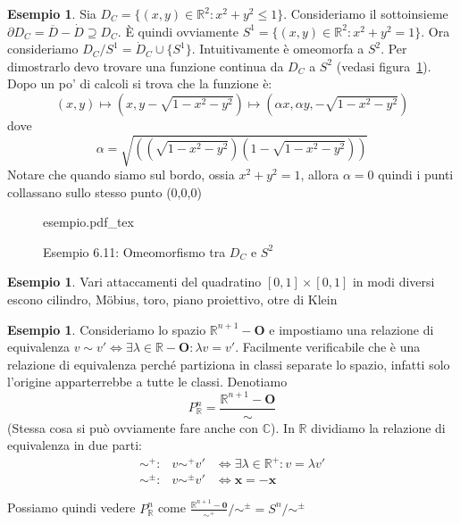 \documentclass{article}
\newcommand{\incfig}[2][1]{%
    \def\svgwidth{#1\columnwidth}
    {#2.pdf_tex}
}
\newcounter{theo}[section]\setcounter{theo}{0}
\newcounter{excounter}[section]\setcounter{excounter}{0}
\theoremstyle{plain}
\theoremstyle{definition}
\newtheorem{example}[excounter]{Esempio}
\theoremstyle{remark}
\begin{document}
\begin{example}
    Sia \(D_C = \{(x,y) \in \mathbb{R}^2:x^2+y^2\le 1\} \). Consideriamo il
    sottoinsieme \(\partial D_C = \overline{D} - \dot{D} \supseteq D_C \). È
    quindi ovviamente \(S^{1} = \{(x,y) \in \mathbb{R}^2 : x^2+y^2 = 1\} \). Ora
    consideriamo \(D_C / S^{1} = \dot{D}_C \cup \{S^{1}\} \). Intuitivamente è
    omeomorfa a \(S^{2}\). Per dimostrarlo devo trovare una funzione continua da
    \(D_C\) a \(S^{2}\) (vedasi figura~\ref{fig:esempio}). Dopo un po' di
    calcoli si trova che la funzione è:
    \[
        (x, y) \mapsto (x, y -\sqrt{1- x^2 - y^2}) \mapsto (\alpha x, \alpha y,
        -\sqrt{1 - x^2 - y^2})
    \]
    dove 
    \[
        \alpha = \sqrt{((\sqrt{1-x^2-y^2})(1-\sqrt{1-x^2-y^2}))}
    \]
    Notare che quando siamo sul bordo, ossia \(x^2+y^2=1\), allora \(\alpha =
    0\) quindi i punti collassano sullo stesso punto (0,0,0)
\end{example}
\begin{figure}[ht]
    \centering
    \incfig[0.8]{esempio}
    \caption{Esempio 6.11: Omeomorfismo tra \(D_C\) e \(S^{2}\) }\label{fig:esempio}
\end{figure}
\begin{example}
    Vari attaccamenti del quadratino \([0,1] \times [0,1]\) in modi diversi
    escono cilindro, Möbius, toro, piano proiettivo, otre di Klein
\end{example}
\begin{example}
    Consideriamo lo spazio \(\mathbb{R}^{n+1} - \mathbf{O}\) e impostiamo una
    relazione di equivalenza \(v\sim v' \iff \exists \lambda \in \mathbb{R} -
    \mathbf{O} : \lambda v = v'\). Facilmente verificabile che è una relazione
    di equivalenza perché partiziona in classi separate lo spazio, infatti solo
    l'origine apparterrebbe a tutte le classi. Denotiamo
    \[
        P_ \mathbb{R}^{n} = \frac{\mathbb{R}^{n+1} - \mathbf{O}}{\sim }
    \]
    (Stessa cosa si può ovviamente fare anche con \(\mathbb{C}\)). In
    \(\mathbb{R}\) dividiamo la
    relazione di equivalenza in due parti:
    \begin{align*}
        \sim ^{+} : & v \sim^{+} v' &\iff \exists \lambda \in \mathbb{R}^{+}:v =
        \lambda v' \\
        \sim^{\pm} : & v\sim ^{\pm}v' &\iff \mathbf{x} = -\mathbf{x}
    \end{align*}

    Possiamo quindi vedere \(P_ \mathbb{R}^{n}\) come \(\frac{\mathbb{R}^{n+1} -
    \mathbf{0}}{\sim^{+}} / \sim^{\pm} = S^{n} / \sim^{\pm}\) 

\end{example}
\end{document}
